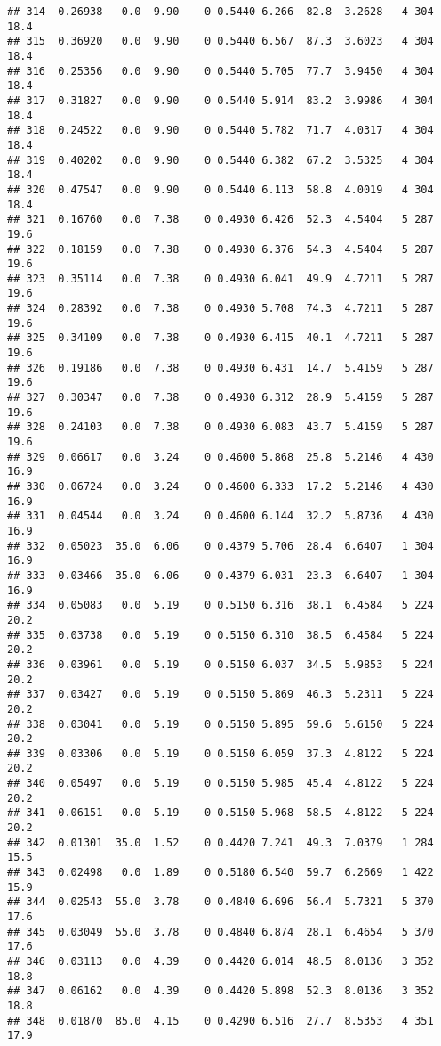 \documentclass[]{article}
\begin{document}
\begin{verbatim}
## 314  0.26938   0.0  9.90    0 0.5440 6.266  82.8  3.2628   4 304    18.4
## 315  0.36920   0.0  9.90    0 0.5440 6.567  87.3  3.6023   4 304    18.4
## 316  0.25356   0.0  9.90    0 0.5440 5.705  77.7  3.9450   4 304    18.4
## 317  0.31827   0.0  9.90    0 0.5440 5.914  83.2  3.9986   4 304    18.4
## 318  0.24522   0.0  9.90    0 0.5440 5.782  71.7  4.0317   4 304    18.4
## 319  0.40202   0.0  9.90    0 0.5440 6.382  67.2  3.5325   4 304    18.4
## 320  0.47547   0.0  9.90    0 0.5440 6.113  58.8  4.0019   4 304    18.4
## 321  0.16760   0.0  7.38    0 0.4930 6.426  52.3  4.5404   5 287    19.6
## 322  0.18159   0.0  7.38    0 0.4930 6.376  54.3  4.5404   5 287    19.6
## 323  0.35114   0.0  7.38    0 0.4930 6.041  49.9  4.7211   5 287    19.6
## 324  0.28392   0.0  7.38    0 0.4930 5.708  74.3  4.7211   5 287    19.6
## 325  0.34109   0.0  7.38    0 0.4930 6.415  40.1  4.7211   5 287    19.6
## 326  0.19186   0.0  7.38    0 0.4930 6.431  14.7  5.4159   5 287    19.6
## 327  0.30347   0.0  7.38    0 0.4930 6.312  28.9  5.4159   5 287    19.6
## 328  0.24103   0.0  7.38    0 0.4930 6.083  43.7  5.4159   5 287    19.6
## 329  0.06617   0.0  3.24    0 0.4600 5.868  25.8  5.2146   4 430    16.9
## 330  0.06724   0.0  3.24    0 0.4600 6.333  17.2  5.2146   4 430    16.9
## 331  0.04544   0.0  3.24    0 0.4600 6.144  32.2  5.8736   4 430    16.9
## 332  0.05023  35.0  6.06    0 0.4379 5.706  28.4  6.6407   1 304    16.9
## 333  0.03466  35.0  6.06    0 0.4379 6.031  23.3  6.6407   1 304    16.9
## 334  0.05083   0.0  5.19    0 0.5150 6.316  38.1  6.4584   5 224    20.2
## 335  0.03738   0.0  5.19    0 0.5150 6.310  38.5  6.4584   5 224    20.2
## 336  0.03961   0.0  5.19    0 0.5150 6.037  34.5  5.9853   5 224    20.2
## 337  0.03427   0.0  5.19    0 0.5150 5.869  46.3  5.2311   5 224    20.2
## 338  0.03041   0.0  5.19    0 0.5150 5.895  59.6  5.6150   5 224    20.2
## 339  0.03306   0.0  5.19    0 0.5150 6.059  37.3  4.8122   5 224    20.2
## 340  0.05497   0.0  5.19    0 0.5150 5.985  45.4  4.8122   5 224    20.2
## 341  0.06151   0.0  5.19    0 0.5150 5.968  58.5  4.8122   5 224    20.2
## 342  0.01301  35.0  1.52    0 0.4420 7.241  49.3  7.0379   1 284    15.5
## 343  0.02498   0.0  1.89    0 0.5180 6.540  59.7  6.2669   1 422    15.9
## 344  0.02543  55.0  3.78    0 0.4840 6.696  56.4  5.7321   5 370    17.6
## 345  0.03049  55.0  3.78    0 0.4840 6.874  28.1  6.4654   5 370    17.6
## 346  0.03113   0.0  4.39    0 0.4420 6.014  48.5  8.0136   3 352    18.8
## 347  0.06162   0.0  4.39    0 0.4420 5.898  52.3  8.0136   3 352    18.8
## 348  0.01870  85.0  4.15    0 0.4290 6.516  27.7  8.5353   4 351    17.9

\end{verbatim}
\end{document}
